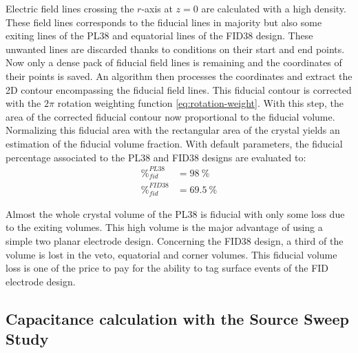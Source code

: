 Electric field lines crossing the $r$-axis at $z=0$ are calculated with a high density. These field lines corresponds to the fiducial lines in majority but also some exiting lines of the PL38 and equatorial lines of the FID38 design. These unwanted lines are discarded thanks to conditions on their start and end points. Now only a dense pack of fiducial field lines is remaining and the coordinates of their points is saved. An algorithm then processes the coordinates and extract the 2D contour encompassing the fiducial field lines. This fiducial contour is corrected with the $2\pi$ rotation weighting function \ref{eq:rotation-weight}. With this step, the area of the corrected fiducial contour now proportional to the fiducial volume. Normalizing this fiducial area with the rectangular area of the crystal yields an estimation of the fiducial volume fraction. With default parameters, the fiducial percentage associated to the PL38 and FID38 designs are evaluated to:
\begin{align}
\%_{fid}^{PL38} &= \SI{98}{\percent} \\
\%_{fid}^{FID38} &= \SI{69.5}{\percent}
\end{align}

Almost the whole crystal volume of the PL38 is fiducial with only some loss due to the exiting volumes. This high volume is the major advantage of using a simple two planar electrode design. Concerning the FID38 design, a third of the volume is lost in the veto, equatorial and corner volumes. This fiducial volume loss is one of the price to pay for the ability to tag surface events of the FID electrode design.


\subsection{Capacitance calculation with the Source Sweep Study}
\label{par:capacitance-matrix}


